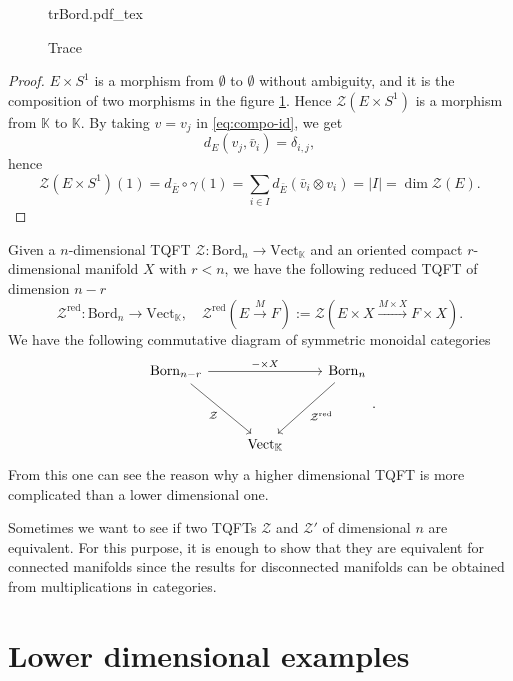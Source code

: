 \documentclass[10pt,reqno,final]{article}
\newcommand{\incfig}[1]{%
    \def\svgscale{0.38}
    {#1.pdf_tex}
}
\numberwithin{equation}{section}
\numberwithin{figure}{section}
\numberwithin{table}{section}
\theoremstyle{plain}
\theoremstyle{definition}
\theoremstyle{remark}
\begin{document}
    \begin{figure}[H]
      \centering
      \incfig{trBord}
      \caption{Trace}
      \label{fig:trBord}
    \end{figure}

    \begin{proof}
      \(E\times S^{1}\) is a morphism from \(\emptyset\) to \(\emptyset\) without ambiguity, and it is the composition of two morphisms in the figure \ref{fig:trBord}. Hence \(\mathcal{Z}(E\times S^{1})\) is a morphism from \(\mathbb{K}\) to \(\mathbb{K}\). By taking \(v=v_{j}\) in \eqref{eq:compo-id}, we get 
      \[
        d_{E }(v_{j},\bar{v}_{i})=\delta_{i,j},
      \]
      hence 
      \[
        \mathcal{Z}(E\times S^{1})(1)=d_{\bar{E}}\circ\gamma(1)=\sum_{i\in I}d_{\bar{E}}(\bar{v}_{i}\otimes v_i)=|I|=\dim \mathcal{Z}(E).
      \]
    \end{proof}


    Given a \(n \)-dimensional TQFT \(\mathcal{Z}:\mathrm{Bord}_{n }\to \mathrm{Vect}_{\mathbb{K}}\) and an oriented compact \(r \)-dimensional manifold \(X\) with \(r<n\), we have the following reduced TQFT of dimension \(n-r\)
    \begin{equation}
      \mathcal{Z}^{\text{red}}:\mathrm{Bord}_{n}\to \mathrm{Vect}_{\mathbb{K}},\quad \mathcal{Z}^{\text{red}}(E\xrightarrow{M} F ):=\mathcal{Z}(E\times X\xrightarrow{M\times X}F\times X).
    \end{equation}
    We have the following commutative diagram of symmetric monoidal categories
    \[
      \begin{tikzcd}
        {\mathrm{Born}_{n-r}} && {\mathrm{Born}_n} \\
        \\
        & {\mathrm{Vect}_{\mathbb{K}}}
        \arrow["{-\times X}", from=1-1, to=1-3]
        \arrow["{\mathcal{Z}}"', from=1-1, to=3-2]
        \arrow["{\mathcal{Z}^{\text{red}}}", from=1-3, to=3-2]
      \end{tikzcd}.
    \]
    From this one can see the reason why a higher dimensional TQFT is more complicated than a lower dimensional one. 
    
    Sometimes we want to see if two TQFTs \(\mathcal{Z}\) and \(\mathcal{Z}'\) of dimensional \(n\) are equivalent. For this purpose, it is enough to show that they are equivalent for connected manifolds since the results for disconnected manifolds can be obtained from multiplications in categories.

    \section{Lower dimensional examples}
\end{document}
